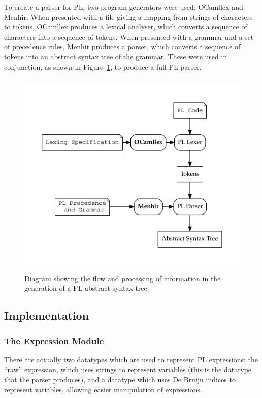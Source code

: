 \documentclass[12pt,a4paper,twoside,openright]{report}
\begin{document}
To create a parser for PL, two program generators were used:
OCamllex and Menhir. When presented with a
file giving a mapping from strings of characters to tokens,
OCamllex produces a lexical analyser, which converts a sequence
of characters into a sequence of tokens. When presented with a
grammar and a set of precedence rules, Menhir produces a parser,
which converts a sequence of tokens into an abstract syntax tree
of the grammar. These were used in conjunction, as shown in
Figure~\ref{fig:parsing}, to produce a full PL parser.

\begin{figure}
	\centering
	\includegraphics[height=10cm]{parsing}
	\caption{Diagram showing the flow and processing of
		information in the generation of a PL abstract
		syntax tree.}
	\label{fig:parsing}
\end{figure}

\subsection{Implementation}

\subsubsection{The Expression Module}
There are actually two datatypes which are used to
represent PL expressions: the ``raw'' expression, which
uses strings to represent variables (this is the
datatype that the parser produces), and a datatype
which uses De Bruijn indices \cite{debr72} to
represent variables, allowing
easier manipulation of expressions.
\end{document}
